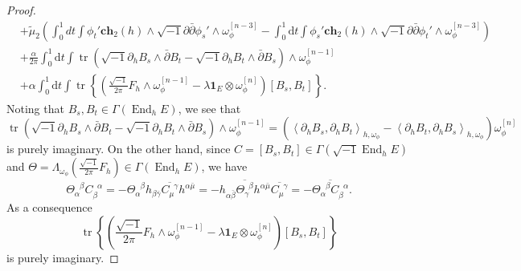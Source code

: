 \documentclass[10pt, letterpaper]{amsart}
\newcommand{\tr}{\operatorname{tr}}
\newcommand{\End}{\operatorname{End}}
\theoremstyle{plain}
\theoremstyle{definition}
\numberwithin{equation}{section}
\begin{document}
\begin{proof}
\begin{equation}
\begin{split}
    & + 
    \widetilde\mu_2 \left( \int_0^1 dt\int \phi_t'\mathbf{ch}_2\left(h\right)\wedge \sqrt{-1}\partial\bar\partial\phi_s'\wedge \omega_\phi^{[n-3]}
    - 
    \int_0^1 \mathrm{d}t \int \phi_s'\mathbf{ch}_2\left(h\right)\wedge \sqrt{-1}\partial\bar\partial \phi_t'\wedge\omega_\phi^{[n-3]}\right)\\
    & + 
    \frac{\alpha}{2\pi} 
    \int_0^1 \mathrm{d}t \int \tr\left(\sqrt{-1}\partial_h B_s\wedge \bar\partial B_t 
    -
    \sqrt{-1}\partial_h B_t\wedge\bar\partial B_s\right)\wedge\omega_\phi^{[n-1]}\\
    & +\alpha\int_0^1 \mathrm{d}t\int 
     \tr
    \left\{ 
    \left(
    \frac{\sqrt{-1}}{2\pi}F_h\wedge \omega_\phi^{[n-1]}
    - 
    \lambda \mathbf{1}_E \otimes \omega_\phi^{[n]}\right) 
    \left[B_s,B_t\right]
    \right\}. 
    \end{split}
\end{equation}
Noting that $B_s, B_t\in \Gamma\left(\End_h E\right)$, we see that 
\[
\tr\left(\sqrt{-1}\partial_h B_s\wedge \bar\partial B_t 
    -
    \sqrt{-1}\partial_h B_t\wedge\bar\partial B_s\right)\wedge\omega_\phi^{[n-1]}
    = 
    \left( \left\langle \partial_h B_s,\partial_h B_t\right\rangle_{h,\omega_\phi}
    -
    \left\langle \partial_h B_t,\partial_h B_s\right\rangle_{h,\omega_\phi}
    \right)
    \omega_\phi^{[n]}
\]
is  purely imaginary. On the other hand, since $C=\left[B_s, B_t\right]\in \Gamma\left(\sqrt{-1}\End_h E\right)$ and $\Theta = \Lambda_{\omega_\phi}\left(\frac{\sqrt{-1}}{2\pi} F_h\right)\in \Gamma\left(\End_h E\right)$, we have 
\[
\Theta_\alpha^{\phantom{\alpha}\beta}C_\beta^{\phantom{\beta}\alpha}
= 
-\Theta_\alpha^{\phantom{\alpha}\beta}h_{\beta\bar\gamma}\overline{C_\mu^{\phantom{\mu}\gamma}}h^{\alpha\bar\mu}
= 
-h_{\alpha\bar\beta}\overline{\Theta_\gamma^{\phantom{\gamma}\beta}}h^{\alpha\bar\mu}\overline{C_\mu^{\phantom{\mu}\gamma}}
=
-\overline{\Theta_\alpha^{\phantom{\alpha}\beta}C_\beta^{\phantom{\beta}\alpha}}. 
\]
As a consequence 
\[
\tr
    \left\{ 
    \left(
    \frac{\sqrt{-1}}{2\pi}F_h\wedge \omega_\phi^{[n-1]}
    - 
    \lambda \mathbf{1}_E \otimes \omega_\phi^{[n]}\right) 
    \left[B_s,B_t\right]
    \right\}
\]
is purely imaginary.


\end{proof}
\end{document}
